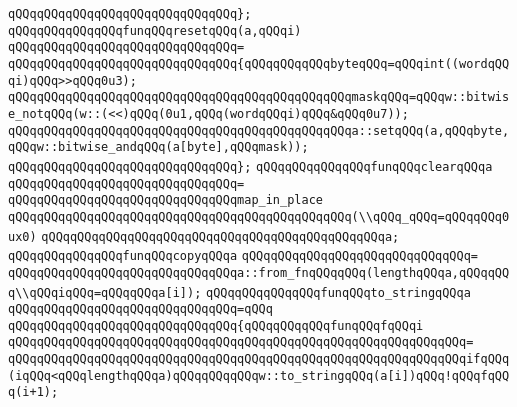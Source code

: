 \verb|qQQqqQQqqQQqqQQqqQQqqQQqqQQqqQQq};|\newline
\newline
\newline
\verb|qQQqqQQqqQQqqQQqfunqQQqresetqQQq(a,qQQqi)|\newline
\verb|qQQqqQQqqQQqqQQqqQQqqQQqqQQqqQQq=|\newline
\verb|qQQqqQQqqQQqqQQqqQQqqQQqqQQqqQQq{qQQqqQQqqQQqbyteqQQq=qQQqint((wordqQQqi)qQQq>>qQQq0u3);|\newline
\verb|qQQqqQQqqQQqqQQqqQQqqQQqqQQqqQQqqQQqqQQqqQQqqQQqmaskqQQq=qQQqw::bitwise_notqQQq(w::(<<)qQQq(0u1,qQQq(wordqQQqi)qQQq&qQQq0u7));|\newline
\verb|qQQqqQQqqQQqqQQqqQQqqQQqqQQqqQQqqQQqqQQqqQQqqQQqa::setqQQq(a,qQQqbyte,qQQqw::bitwise_andqQQq(a[byte],qQQqmask));|\newline
\verb|qQQqqQQqqQQqqQQqqQQqqQQqqQQqqQQq};|\newline
\newline
\newline
\verb|qQQqqQQqqQQqqQQqfunqQQqclearqQQqa|\newline
\verb|qQQqqQQqqQQqqQQqqQQqqQQqqQQqqQQq=|\newline
\verb|qQQqqQQqqQQqqQQqqQQqqQQqqQQqqQQqmap_in_place|\newline
\verb|qQQqqQQqqQQqqQQqqQQqqQQqqQQqqQQqqQQqqQQqqQQqqQQq(\\qQQq_qQQq=qQQqqQQq0ux0)|\newline
\verb|qQQqqQQqqQQqqQQqqQQqqQQqqQQqqQQqqQQqqQQqqQQqqQQqa;|\newline
\newline
\newline
\verb|qQQqqQQqqQQqqQQqfunqQQqcopyqQQqa|\newline
\verb|qQQqqQQqqQQqqQQqqQQqqQQqqQQqqQQq=|\newline
\verb|qQQqqQQqqQQqqQQqqQQqqQQqqQQqqQQqa::from_fnqQQqqQQq(lengthqQQqa,qQQqqQQq\\qQQqiqQQq=qQQqqQQqa[i]);|\newline
\newline
\newline
\verb|qQQqqQQqqQQqqQQqfunqQQqto_stringqQQqa|\newline
\verb|qQQqqQQqqQQqqQQqqQQqqQQqqQQqqQQq=qQQq|\newline
\verb|qQQqqQQqqQQqqQQqqQQqqQQqqQQqqQQq{qQQqqQQqqQQqfunqQQqfqQQqi|\newline
\verb|qQQqqQQqqQQqqQQqqQQqqQQqqQQqqQQqqQQqqQQqqQQqqQQqqQQqqQQqqQQqqQQq=|\newline
\verb|qQQqqQQqqQQqqQQqqQQqqQQqqQQqqQQqqQQqqQQqqQQqqQQqqQQqqQQqqQQqqQQqifqQQq(iqQQq<qQQqlengthqQQqa)qQQqqQQqqQQqw::to_stringqQQq(a[i])qQQq!qQQqfqQQq(i+1);|\newline
